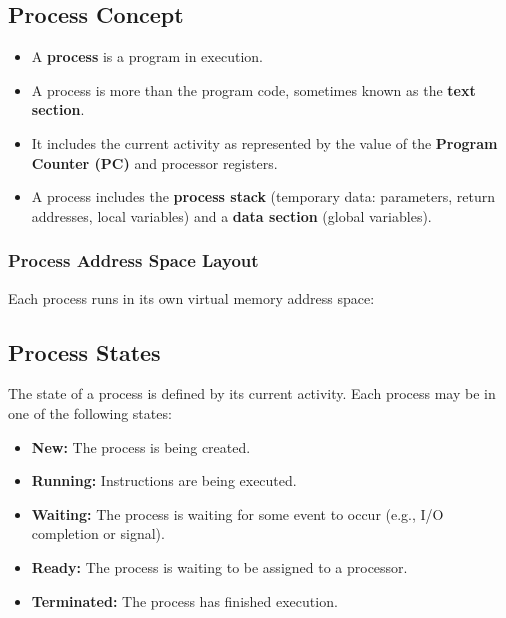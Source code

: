 \documentclass[10pt,a4paper]{article}
\begin{document}
\subsection{Process Concept}
\begin{itemize}
    \item A \textbf{process} is a program in execution.
    \item A process is more than the program code, sometimes known as the \textbf{text section}.
    \item It includes the current activity as represented by the value of the \textbf{Program Counter (PC)} and processor registers.
    \item A process includes the \textbf{process stack} (temporary data: parameters, return addresses, local variables) and a \textbf{data section} (global variables).
\end{itemize}

\subsubsection*{Process Address Space Layout}
Each process runs in its own virtual memory address space:
\begin{center}
\end{center}

\subsection{Process States}
The state of a process is defined by its current activity. Each process may be in one of the following states:
\begin{itemize}
    \item \textbf{New:} The process is being created.
    \item \textbf{Running:} Instructions are being executed.
    \item \textbf{Waiting:} The process is waiting for some event to occur (e.g., I/O completion or signal).
    \item \textbf{Ready:} The process is waiting to be assigned to a processor.
    \item \textbf{Terminated:} The process has finished execution.
\end{itemize}
\end{document}

